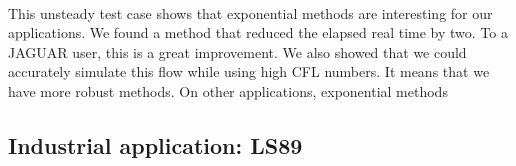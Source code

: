       \paragraph{}
      This unsteady test case shows that exponential methods are interesting for our applications.
      We found a method that reduced the elapsed real time by two.
      To a JAGUAR user, this is a great improvement.
      We also showed that we could accurately simulate this flow while using high CFL numbers.
      It means that we have more robust methods.
      On other applications, exponential methods 







    \subsection{Industrial application: LS89}
